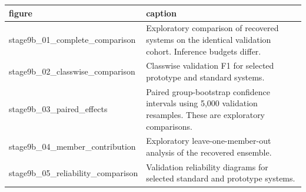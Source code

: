 \begin{tabular}{ll}
\toprule
figure & caption \\
\midrule
stage9b\_01\_complete\_comparison & Exploratory comparison of recovered systems on the identical validation cohort. Inference budgets differ. \\
stage9b\_02\_classwise\_comparison & Classwise validation F1 for selected prototype and standard systems. \\
stage9b\_03\_paired\_effects & Paired group-bootstrap confidence intervals using 5,000 validation resamples. These are exploratory comparisons. \\
stage9b\_04\_member\_contribution & Exploratory leave-one-member-out analysis of the recovered ensemble. \\
stage9b\_05\_reliability\_comparison & Validation reliability diagrams for selected standard and prototype systems. \\
\bottomrule
\end{tabular}
